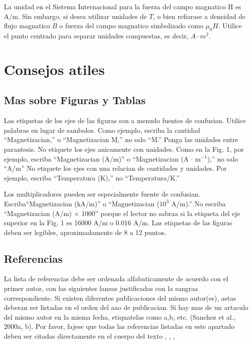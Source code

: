 \documentclass[5p,times,authoryear]{elsarticle}
\begin{document}
La unidad en el Sistema Internacional para la fuerza del campo
magnatico H es A/m. Sin embargo, si desea utilizar unidades de $T$,
o bien refiarase a densidad de flujo magnatico $B$ o fuerza del
campo magnatico simbolizado como $\mu_0 H$. Utilice el punto
centrado para separar unidades compuestas,  es decir, $A\cdot m^2$.

\section{Consejos atiles}

\subsection{Mas sobre Figuras y Tablas}

Las etiquetas de los ejes de las figuras son a menudo fuentes de
confusian. Utilice palabras en lugar de sambolos. Como ejemplo,
escriba la cantidad ``Magnetizacian,'' o ``Magnetizacian M,'' no
salo ``M.'' Ponga las unidades entre parantesis. No etiquete los
ejes anicamente con unidades. Como en la Fig. 1, por ejemplo,
escriba ``Magnetizacian (A/m)'' o ``Magnetizacian (A $\cdot$
m$^{-1}$),'' no salo ``A/m'' No etiquete los ejes con una relacian
de cantidades y unidades. Por ejemplo, escriba ``Temperatura (K),''
no ``Temperatura/K.''

Los multiplicadores pueden ser especialmente fuente de confusian.
Escriba``Magnetizacian (kA/m)'' o ``Magnetizacian ($10^3$ A/m).'' No
escriba ``Magnetizacian (A/m) $\times$ 1000'' porque el lector no
sabraa si la etiqueta del eje superior en la Fig. 1 es 16000 A/m o
0.016 A/m. Las etiquetas de las figuras deben ser legibles,
aproximadamente de 8 a 12 puntos.

\subsection{Referencias} %

La lista de referencias debe ser ordenada alfabaticamente
de acuerdo con el primer autor, con las siguientes laneas justificadas con la sangraa correspondiente.
Si existen diferentes publicaciones del mismo autor(es), astas deberan ser listadas en el orden del
aao de publicacian. Si hay mas de un artaculo del mismo autor en la misma fecha,
etiquatelas como a,b, etc. (Sanchez et al., 2000a, b). Por favor,
fajese que todas las referencias \citep{Garcia:2007}
listadas en este apartado \citep{Garcia:2008}
deben ser citadas directamente en el cuerpo del texto \citep{Garcia:2004}, \citep{Dog:58},
\citep{Keo:58},
\end{document}
